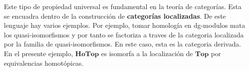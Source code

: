 \begin{nota}
    Este tipo de propiedad universal es fundamental en la teoría de categorías. Esta se encuadra dentro de la construcción de \textbf{categorías localizadas}. De este lenguaje hay varios ejemplos. Por ejemplo, tomar homología en dg-modulos mata los quasi-isomorfismos y por tanto se factoriza a traves de la categoria localizada por la familia de quasi-isomorfismos. En este caso, esta es la categoria derivada. En el presente ejemplo, $\mathbf{HoTop}$ es isomorfa a la localización de $\mathbf{Top}$ por equivalencias homotópicas.
\end{nota}

